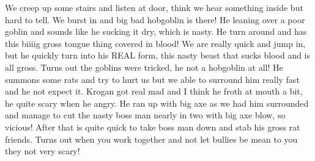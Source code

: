 We creep up some stairs and listen at door, think we hear something inside but hard to tell. We burst in and big bad hobgoblin is there! He leaning over a poor goblin and sounds like he sucking it dry, which is nasty. He turn around and has this biiiig gross tongue thing covered in blood! We are really quick and jump in, but he quickly turn into his REAL form, this nasty beast that sucks blood and is all gross. Turns out the goblins were tricked, he not a hobgoblin at all! He summons some rats and try to hurt us but we able to surround him really fast and he not expect it. Krogan got real mad and I think he froth at mouth a bit, he quite scary when he angry. He ran up with big axe as we had him surrounded and manage to cut the nasty boss man nearly in two with big axe blow, so vicious! After that is quite quick to take boss man down and stab his gross rat friends. Turns out when you work together and not let bullies be mean to you they not very scary!\medskip

\vspace*{5mm}
